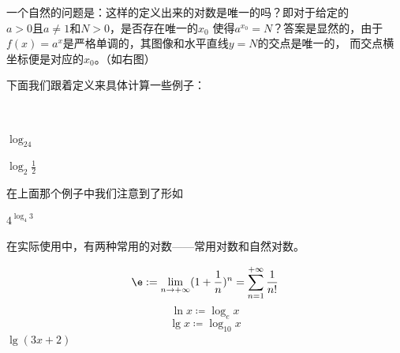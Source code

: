 \begin{minipage}{0.65\textwidth}

    一个自然的问题是：这样的定义出来的对数是唯一的吗？即对于给定的$a>0\text{且}a\neq1$和$N>0$，是否存在唯一的$x_0$
    使得$a^{x_0}=N$？答案是显然的，由于$f(x)=a^{x}$是严格单调的，其图像和水平直线$y=N$的交点是唯一的，
    而交点横坐标便是对应的$x_0$。（如右图）  
\end{minipage}%
\hfill%
\begin{minipage}{0.25\textwidth}
\end{minipage}

下面我们跟着定义来具体计算一些例子：
\begin{example}
    \ 

    $\log_24$

    $\log_2\frac{1}{2}$
\end{example}
在上面那个例子中我们注意到了形如
\begin{theorem}[对数恒等式]
    
\end{theorem}
\begin{example}
    $4^{\log_4 3}$
\end{example}
在实际使用中，有两种常用的对数——常用对数和自然对数。
\begin{definition}[自然对数与常用对数]
    

    \[\e:=\lim_{n\rightarrow +\infty}(1+\frac{1}{n})^n
    =\sum_{n=1}^{+\infty}\frac{1}{n!}\]
    \[\ln x \coloneqq \log _e x\]
    \[\lg x \coloneqq \log _{10} x\]
    $\lg(3x+2)$
\end{definition}

